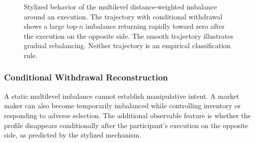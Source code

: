 \documentclass[11pt]{article}
\newenvironment{review}{\begingroup\color{blue}}{\endgroup}
\begin{document}
\begin{figure}[htbp]
    \caption{\begin{review}Stylized behavior of the multilevel distance-weighted imbalance around an execution.\end{review} \begin{review}The trajectory with conditional withdrawal\end{review} shows a large top-$n$ imbalance returning rapidly toward zero after \begin{review}the execution on the opposite side\end{review}. The smooth
    trajectory illustrates gradual rebalancing. Neither trajectory is an empirical classification rule.}
    \label{fig:topn_imbalance_dynamics}
\end{figure}
\FloatBarrier

\subsubsection{Conditional Withdrawal Reconstruction}
\label{subsec:multilevel_conditionality}

A static multilevel imbalance cannot establish manipulative intent. A market maker can also become temporarily imbalanced
while controlling inventory or responding to adverse selection. The additional observable feature is whether the profile
disappears conditionally after the participant's execution on the opposite side, as predicted by the stylized mechanism.
\end{document}

